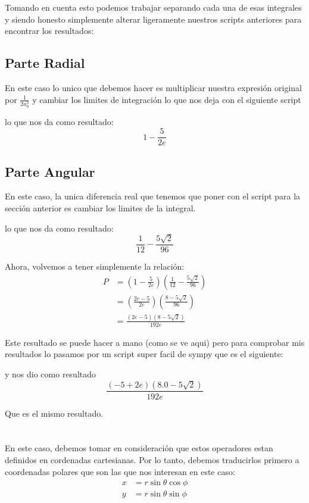 \documentclass{report}
\begin{document}
Tomando en cuenta esto podemos trabajar separando cada una de esas integrales y siendo honesto simplemente alterar ligeramente nuestros scripts anteriores para encontrar los resultados:
\subsection{Parte Radial}

En este caso lo unico que debemos hacer es multiplicar nuestra expresión original por $\frac{1}{2a_0^3}$ y cambiar los limites de integración lo que nos deja con el siguiente script


lo que nos da como resultado: \[
	1 - \frac{5}{2 e}
\]

\subsection{Parte Angular}

En este caso, la unica diferencia real que tenemos que poner con el script para la sección anterior es cambiar los limites de la integral.


lo que nos da como resultado: \[
	\frac{1}{12} - \frac{5 \sqrt{2}}{96}
\]

Ahora, volvemos a tener simplemente la relación:
\begin{align*}
	P &= \left( 1 - \frac{5}{2 e} \right)\left( \frac{1}{12} - \frac{5 \sqrt{2}}{96} \right)\\
	&= \left( \frac{2e - 5}{2e} \right) \left( \frac{8 - 5\sqrt{2} }{96} \right)\\
	&= \frac{\left(2 e - 5\right) \left(8 - 5 \sqrt{2}\right)}{192 e}
\end{align*}

Este resultado se puede hacer a mano (como se ve aqui) pero para comprobar mis resultados lo pasamos por un script super facil de sympy que es el siguiente:


y nos dio como resultado \[
	\frac{\left(-5 + 2 e\right) \left(8.0 - 5 \sqrt{2}\right)}{192 e}
\]

Que es el mismo resultado.

\section{}

En este caso, debemos tomar en consideración que estos operadores estan definidos en cordenadas cartesianas. Por lo tanto, debemos traducirlos primero a coordenadas polares que son las que nos interesan en este caso:
\begin{align*}
	x &= r\sin\theta\cos\phi\\
	y &= r\sin\theta\sin\phi
\end{align*}
\end{document}
